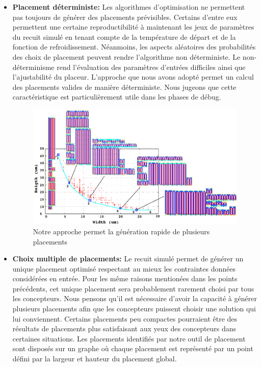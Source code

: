 \begin{itemize}
\item \textbf{Placement déterministe:} Les algorithmes d'optimisation ne permettent pas toujours de générer des placements prévisibles. Certains d'entre eux permettent une certaine reproductibilité à maintenant les jeux de paramètres du recuit simulé en tenant compte de la température de départ et de la fonction de refroidissement. Néanmoins, les aspects aléatoires des probabilités des choix de placement peuvent rendre l'algorithme non déterministe. Le non-déterminisme rend l'évaluation des paramètres d'entrées difficiles ainsi que l'ajustabilité du placeur. L'approche que nous avons adopté permet un calcul des placements valides de manière déterministe. Nous jugeons que cette caractéristique est particulièrement utile dans les phases de débug.
\begin{figure}[h]
\begin{center}
\includegraphics[height=0.25\textheight]{Figures/7-1.png}
\caption{Notre approche permet la génération rapide de plusieurs placements}
\label{fig:3}
\end{center}
\end{figure}
\item \textbf{Choix multiple de placements:} Le recuit simulé permet de générer un unique placement optimisé respectant au mieux les contraintes données considérées en entrée. Pour les même raisons mentionées dans les points précédents, cet unique placement sera probablement rarement choisi par tous les concepteurs. Nous pensons qu'il est nécessaire d'avoir la capacité à générer plusieurs placements afin que les concepteurs puissent choisir une solution qui lui conviennent. Certains placements peu compactes pourraient être des résultats de placements plus satisfaisant aux yeux des concepteurs dans certaines situations. Les placements identifiés par notre outil de placement sont disposés sur un graphe o\`u chaque placement est représenté par un point défini par la largeur et hauteur du placement global.


\end{itemize}
